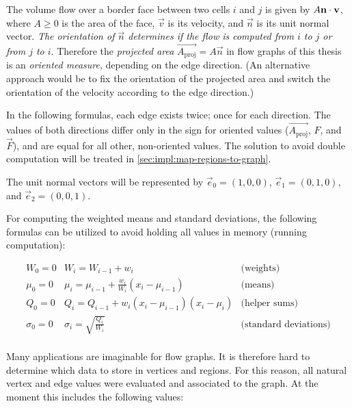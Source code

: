 The volume flow over a border face between two cells $i$ and $j$ is given by $A{\mathbf n} \cdot {\mathbf v}$, where $A\ge0$ is the area of the face, $\vec{v}$ is its velocity, and $\vec{n}$ is its unit normal vector. \emph{The orientation of $\vec{n}$ determines if the flow is computed from $i$ to $j$ or from $j$ to $i$}. Therefore the \emph{projected area} $\vec{A_\text{proj}}=A\vec{n}$ in flow graphs of this thesis is an \emph{oriented measure}, depending on the edge direction. (An alternative approach would be to fix the orientation of the projected area and switch the orientation of the velocity according to the edge direction.)

In the following formulas, each edge exists twice; once for each direction. The values of both directions differ only in the sign for oriented values ($\vec{A_\text{proj}}$, $F$, and $\vec{F}$), and are equal for all other, non-oriented values. The solution to avoid double computation will be treated in \autoref{sec:impl:map-regions-to-graph}.

The unit normal vectors will be represented by $\vec{e}_0=(1,0,0)$,  $\vec{e}_1=(0,1,0)$, and $\vec{e}_2=(0,0,1)$.

For computing the weighted means and standard deviations, the following formulas can be utilized to avoid holding all values in memory (running computation):%

\begin{equation}
	\begin{array}{lll}
		W_0 = 0      & W_i = W_{i-1} + w_i
		  & \text{(weights)}\\
		\mu_0 = 0    & \mu_i = \mu_{i-1} + \frac{w_i}{W_i} (x_i - \mu_{i-1})
		  & \text{(means)}\\
		Q_0 = 0      & Q_i = Q_{i-1} + w_i (x_i - \mu_{i-1}) (x_i - \mu_i)
		  & \text{(helper sums)}\\
		\sigma_0 = 0 & \sigma_i = \sqrt{\frac{Q_i}{W_i}}
		  & \text{(standard deviations)}\\
	\end{array}
\end{equation}


Many applications are imaginable for flow graphs. It is therefore hard to determine which data to store in vertices and regions. For this reason, all natural vertex and edge values were evaluated and associated to the graph. At the moment this includes the following values:
%
%



